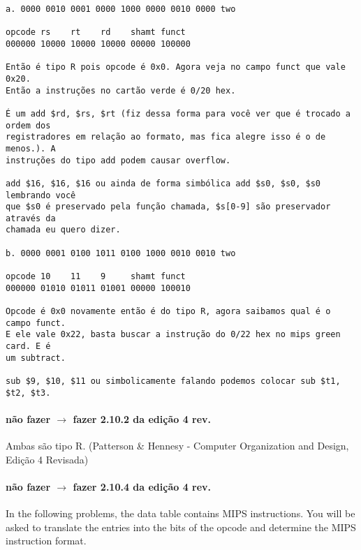 \documentclass{article}
\begin{document}
\begin{verbatim}
a. 0000 0010 0001 0000 1000 0000 0010 0000 two

opcode rs    rt    rd    shamt funct
000000 10000 10000 10000 00000 100000

Então é tipo R pois opcode é 0x0. Agora veja no campo funct que vale 0x20. 
Então a instruções no cartão verde é 0/20 hex.

É um add $rd, $rs, $rt (fiz dessa forma para você ver que é trocado a ordem dos 
registradores em relação ao formato, mas fica alegre isso é o de menos.). A  
instruções do tipo add podem causar overflow.

add $16, $16, $16 ou ainda de forma simbólica add $s0, $s0, $s0 lembrando você 
que $s0 é preservado pela função chamada, $s[0-9] são preservador através da 
chamada eu quero dizer.

b. 0000 0001 0100 1011 0100 1000 0010 0010 two

opcode 10    11    9     shamt funct
000000 01010 01011 01001 00000 100010

Opcode é 0x0 novamente então é do tipo R, agora saibamos qual é o campo funct. 
E ele vale 0x22, basta buscar a instrução do 0/22 hex no mips green card. E é 
um subtract.

sub $9, $10, $11 ou simbolicamente falando podemos colocar sub $t1, $t2, $t3.
\end{verbatim}

\paragraph{não fazer  $\rightarrow$ fazer 2.10.2 da edição 4 rev.}

Ambas são tipo R. (Patterson \& Hennesy - Computer Organization and Design, 
Edição 4 Revisada)

\paragraph{não fazer  $\rightarrow$ fazer 2.10.4 da edição 4 rev.}

In the following problems, the data table contains MIPS instructions. You will 
be asked to translate the entries into the bits of the opcode and determine the 
MIPS instruction format.
\end{document}
